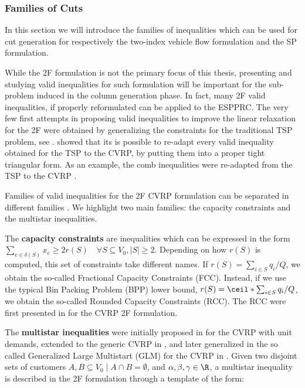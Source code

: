 \subsubsection{Families of Cuts}
\label{sec:families-of-cuts}

In this section we will introduce the families of inequalities
which can be used for cut generation for respectively
the two-index vehicle flow formulation
and the SP formulation.


While the 2F formulation is not the primary focus of this thesis,
presenting and studying valid inequalities for such formulation
will be important for the sub-problem induced in the column generation phase.
In fact, many 2F valid inequalities, if properly reformulated
can be applied to the ESPPRC.
The very few first attempts in proposing valid inequalities
to improve the linear relaxation for the 2F were obtained by
generalizing the constraints for the traditional TSP problem, see \textcite{naddef1993}.
\citeauthor{naddef1993} showed that its is possible to re-adapt
every valid inequality obtained for the TSP to the CVRP,
by putting them into a proper tight triangular form.
As an example,
the comb inequalities were re-adapted from the TSP to the CVRP \parencite{chvatal1973,grotschel1979,augerat1995a}.

Families of valid inequalities for the 2F CVRP formulation
can be separated in different families \parencite{toth2014}.
We highlight two main families: the capacity constraints and the multistar inequalities.

The \textbf{capacity constraints} are inequalities which can be expressed in the form
$\sum_{e \in \delta(S)} x_e \ge 2 r(S) \quad \forall S \subseteq V_0, |S| \ge 2$.
Depending on how $r(S)$ is computed, this set of constraints take different names.
If $r(S) = \sum_{i \in S} q_i / Q$, we obtain the so-called Fractional Capacity Constraints (FCC).
Instead, if we use the typical Bin Packing Problem (BPP) lower bound, $r(S) = \ceil*{\sum_{i \in S} q_i / Q}$, we obtain the so-called Rounded Capacity Constraints (RCC).
The RCC were first presented in \textcite{laporte1983} for the CVRP 2F formulation.

The \textbf{multistar inequalities} were initially proposed in \textcite{araque1990} for the CVRP with unit demands,
extended to the generic CVRP in \textcite{gouveia1995, achuthan1998},
and later generalized in the so called Generalized Large Multistart (GLM) for the CVRP in \textcite{letchford2002} .
Given two disjoint sets of customers $A, B \subseteq V_0 \mid A \cap B = \emptyset$,
and $\alpha, \beta, \gamma \in \R$,
a multistar inequality is described in the 2F formulation through a
template of the form:

